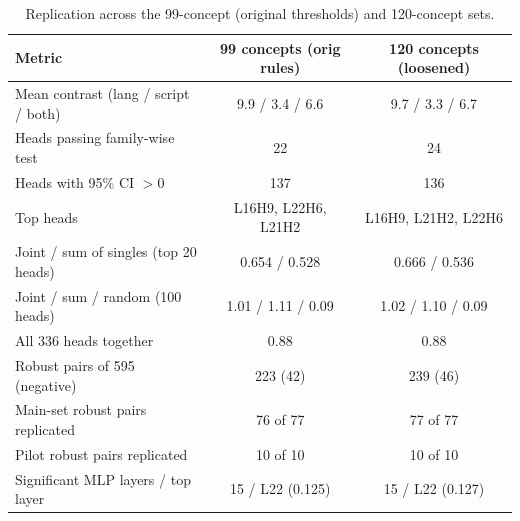 \begin{table}[t]
\centering
\small
\begin{tabular}{lcc}
\toprule
\textbf{Metric} & \textbf{99 concepts (orig rules)} & \textbf{120 concepts (loosened)} \\
\midrule
Mean contrast (lang / script / both) & 9.9 / 3.4 / 6.6 & 9.7 / 3.3 / 6.7 \\
Heads passing family-wise test & 22 & 24 \\
Heads with 95\% CI $>0$ & 137 & 136 \\
Top heads & L16H9, L22H6, L21H2 & L16H9, L21H2, L22H6 \\
Joint / sum of singles (top 20 heads) & 0.654 / 0.528 & 0.666 / 0.536 \\
Joint / sum / random (100 heads) & 1.01 / 1.11 / 0.09 & 1.02 / 1.10 / 0.09 \\
All 336 heads together & 0.88 & 0.88 \\
Robust pairs of 595 (negative) & 223 (42) & 239 (46) \\
Main-set robust pairs replicated & 76 of 77 & 77 of 77 \\
Pilot robust pairs replicated & 10 of 10 & 10 of 10 \\
Significant MLP layers / top layer & 15 / L22 (0.125) & 15 / L22 (0.127) \\
\bottomrule
\end{tabular}
\caption{Replication across the 99-concept (original thresholds) and 120-concept sets.}
\label{tab:replication}
\end{table}
